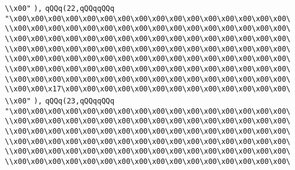 \verb|\\x00"|\newline
\verb|),|\newline
\verb|qQQq(22,qQQqqQQq|\newline
\verb|"\x00\x00\x00\x00\x00\x00\x00\x00\x00\x00\x00\x00\x00\x00\x00\x00\|\newline
\verb|\\x00\x00\x00\x00\x00\x00\x00\x00\x00\x00\x00\x00\x00\x00\x00\x00\|\newline
\verb|\\x00\x00\x00\x00\x00\x00\x00\x00\x00\x00\x00\x00\x00\x00\x00\x00\|\newline
\verb|\\x00\x00\x00\x00\x00\x00\x00\x00\x00\x00\x00\x00\x00\x00\x00\x00\|\newline
\verb|\\x00\x00\x00\x00\x00\x00\x00\x00\x00\x00\x00\x00\x00\x00\x00\x00\|\newline
\verb|\\x00\x00\x00\x00\x00\x00\x00\x00\x00\x00\x00\x00\x00\x00\x00\x00\|\newline
\verb|\\x00\x00\x00\x00\x00\x00\x00\x00\x00\x00\x00\x00\x00\x00\x00\x00\|\newline
\verb|\\x00\x00\x17\x00\x00\x00\x00\x00\x00\x00\x00\x00\x00\x00\x00\x00\|\newline
\verb|\\x00"|\newline
\verb|),|\newline
\verb|qQQq(23,qQQqqQQq|\newline
\verb|"\x00\x00\x00\x00\x00\x00\x00\x00\x00\x00\x00\x00\x00\x00\x00\x00\|\newline
\verb|\\x00\x00\x00\x00\x00\x00\x00\x00\x00\x00\x00\x00\x00\x00\x00\x00\|\newline
\verb|\\x00\x00\x00\x00\x00\x00\x00\x00\x00\x00\x00\x00\x00\x00\x00\x00\|\newline
\verb|\\x00\x00\x00\x00\x00\x00\x00\x00\x00\x00\x00\x00\x00\x00\x00\x00\|\newline
\verb|\\x00\x00\x00\x00\x00\x00\x00\x00\x00\x00\x00\x00\x00\x00\x00\x00\|\newline
\verb|\\x00\x00\x00\x00\x00\x00\x00\x00\x00\x00\x00\x00\x00\x00\x00\x00\|\newline
